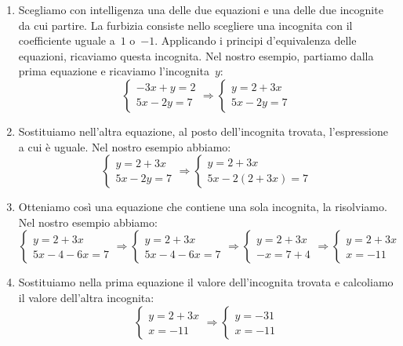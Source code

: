 \begin{enumerate}
 \item Scegliamo con intelligenza una delle due equazioni e una
delle due incognite da cui partire. 
La furbizia consiste nello scegliere una incognita con il coefficiente uguale 
a~\(1\) o~\(-1\).
Applicando i principi d'equivalenza delle equazioni, ricaviamo questa
incognita.
Nel nostro esempio, partiamo dalla prima equazione e ricaviamo
l'incognita~\(y\):
\[\left\{\begin{array}{l}
     -3x+y=2\\
     5x-2y=7
    \end{array}
\right.
\Rightarrow
\left\{\begin{array}{l}y=2+3x \\
         5x-2y=7
\end{array}\right.\]

 \item Sostituiamo nell'altra equazione, al posto
dell'incognita trovata, l'espressione a cui è uguale. 
Nel nostro esempio abbiamo:
\[\left\{\begin{array}{l}
     y=2+3x\\
     5x-2y=7
    \end{array}
\right.
\Rightarrow
\left\{\begin{array}{l}y=2+3x \\
         5x-2(2+3x)=7
\end{array}\right.\]

 \item Otteniamo così una equazione che contiene una sola 
incognita, la risolviamo.
Nel nostro esempio abbiamo:
\[\left\{\begin{array}{l}y=2+3x\\
5x-4-6x=7\end{array}\right.\Rightarrow
\left\{\begin{array}{l}
         y=2+3x\\
         5x-4-6x=7
        \end{array}\right.\Rightarrow
 \left\{\begin{array}{l}y=2+3x\\
         -x=7+4
        \end{array}\right.\Rightarrow
 \left\{\begin{array}{l}y=2+3x\\
         x=-11
  \end{array}\right.\]

 \item Sostituiamo nella prima equazione il valore dell'incognita trovata e 
calcoliamo il valore dell'altra incognita:
\[ \left\{\begin{array}{l}y=2+3x\\
         x=-11
  \end{array}\right.\Rightarrow
  \left\{\begin{array}{l}
         y=-31\\
         x=-11
  \end{array}\right.\]


\end{enumerate}
